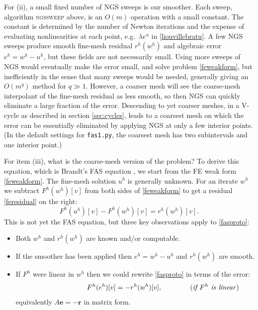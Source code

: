 \documentclass[letterpaper,final,12pt,reqno]{amsart}
\newcommand{\be}{\mathbf{e}}
\newcommand{\br}{\mathbf{r}}
\begin{document}
For (ii), a small fixed number of NGS sweeps is our smoother.  Each sweep, algorithm \textsc{ngssweep} above, is an $O(m)$ operation with a small constant.  The constant is determined by the number of Newton iterations and the expense of evaluating nonlinearities at each point, e.g.~$\lambda e^u$ in \eqref{liouvillebratu}.  A few NGS sweeps produce smooth fine-mesh residual $r^h(w^h)$ and algebraic error $e^h = w^h - u^h$, but these fields are not necessarily small.  Using more sweeps of NGS would eventually make the error small, and solve problem \eqref{feweakform}, but inefficiently in the sense that many sweeps would be needed, generally giving an $O(m^q)$ method for $q\gg 1$.  However, a coarser mesh will see the coarse-mesh interpolant of the fine-mesh residual as less smooth, so then NGS can quickly eliminate a large fraction of the error.  Descending to yet coarser meshes, in a V-cycle as described in section \ref{sec:cycles}, leads to a coarsest mesh on which the error can be essentially eliminated by applying NGS at only a few interior points.  (In the default settings for \texttt{fas1.py}, the coarsest mesh has two subintervals and one interior point.)

For item (iii), what is the coarse-mesh version of the problem?  To derive this equation, which is Brandt's FAS equation \cite{Brandt1977}, we start from the FE weak form \eqref{feweakform}.  The fine-mesh solution $u^h$ is generally unknown.  For an iterate $w^h$ we subtract $F^h(w^h)[v]$ from both sides of \eqref{feweakform} to get a residual \eqref{feresidual} on the right:
\begin{equation}
  F^h(u^h)[v] - F^h(w^h)[v] = r^h(w^h)[v]. \label{fasproto}
\end{equation}
This is not yet the FAS equation, but three key observations apply to \eqref{fasproto}:
\begin{itemize}
\item Both $w^h$ and $r^h(w^h)$ are known and/or computable.
\item If the smoother has been applied then $e^h=w^h-u^h$ and $r^h(w^h)$ are smooth.
\item If $F^h$ were linear in $w^h$ then we could rewrite \eqref{fasproto} in terms of the error:
    $$\qquad\qquad\qquad\qquad F^h(e^h)[v] = -r^h(w^h)[v], \qquad\qquad (\text{\emph{if $F^h$ is linear}})$$
equivalently $A\be=-\br$ in matrix form.
\end{itemize}
\end{document}
